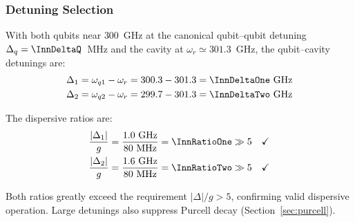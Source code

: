 \subsubsection{Detuning Selection}

With both qubits near $300$~GHz at the canonical qubit--qubit detuning
$\Delta_q = \InnDeltaQ$~MHz and the cavity at $\omega_r \simeq 301.3$~GHz, the
qubit--cavity detunings are:
\begin{align}
\Delta_1 &= \omega_{q1} - \omega_r = 300.3 - 301.3 = \InnDeltaOne \text{ GHz} \\
\Delta_2 &= \omega_{q2} - \omega_r = 299.7 - 301.3 = \InnDeltaTwo \text{ GHz}
\end{align}

The dispersive ratios are:
\begin{align}
\frac{|\Delta_1|}{g} &= \frac{1.0 \text{ GHz}}{80 \text{ MHz}} = \InnRatioOne \gg 5 \quad \checkmark \\
\frac{|\Delta_2|}{g} &= \frac{1.6 \text{ GHz}}{80 \text{ MHz}} = \InnRatioTwo \gg 5 \quad \checkmark
\end{align}

Both ratios greatly exceed the requirement $|\Delta|/g > 5$, confirming valid dispersive operation. Large detunings also suppress Purcell decay (Section~\ref{sec:purcell}).

